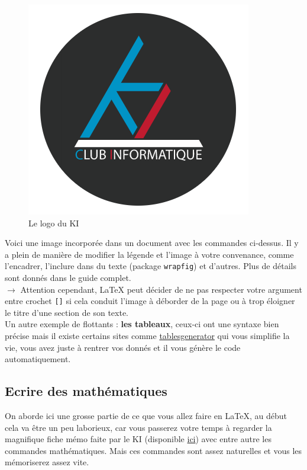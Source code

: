 \documentclass[11pt]{article}				%
\begin{document}
\begin{figure}[h!]
\centering
\includegraphics[scale=0.2]{ressources/KI.png}
\caption{Le logo du KI}
\end{figure}




Voici une image incorporée dans un document avec les commandes ci-dessus. Il y a plein de manière de modifier la légende et l'image à votre convenance, comme l'encadrer, l'inclure dans du texte (package \texttt{wrapfig}) et d'autres. Plus de détails sont donnés dans le guide complet.\\


$\rightarrow$ Attention cependant, LaTeX peut décider de ne pas respecter votre argument entre crochet \texttt{[]} si cela conduit l'image à déborder de la page ou à trop éloigner le titre d'une section de son texte.\\

Un autre exemple de flottants : \textbf{les tableaux}, ceux-ci ont une syntaxe bien précise mais il existe certains sites comme \href{https://www.tablesgenerator.com/}{tablesgenerator} qui vous simplifie la vie, vous avez juste à rentrer vos donnés et il vous génère le code automatiquement.


\subsection*{Ecrire des mathématiques}

On aborde ici une grosse partie de ce que vous allez faire en LaTeX, au début cela va être un peu laborieux, car vous passerez votre temps à regarder la magnifique fiche mémo faite par le KI (disponible \href{http://latex.enpc.org}{ici}) avec entre autre les commandes mathématiques. Mais ces commandes sont assez naturelles et vous les mémoriserez assez vite.\\
\end{document}
